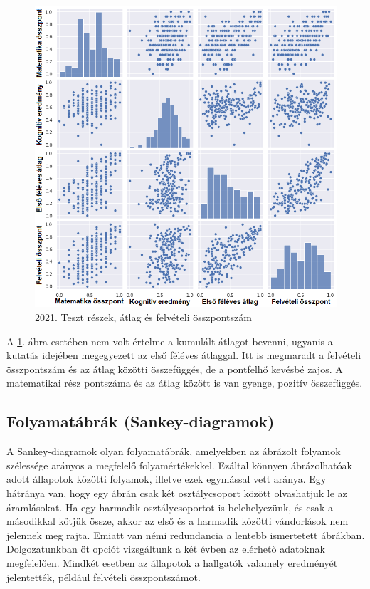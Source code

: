\documentclass[12pt]{article}
\begin{document}
\begin{figure}[H]
\centering
\includegraphics[width=\textwidth]{kepek/2021minmax.png}
\caption{2021. Teszt részek, átlag és felvételi összpontszám}
\label{fig:2021minmax}
\end{figure}

A \ref{fig:2021minmax}. ábra esetében nem volt értelme a kumulált átlagot bevenni, ugyanis a kutatás idejében megegyezett az első féléves átlaggal. Itt is megmaradt a felvételi összpontszám és az átlag közötti összefüggés, de a pontfelhő kevésbé zajos. A matematikai rész pontszáma és az átlag között is van gyenge, pozitív összefüggés.



\subsection{Folyamatábrák (Sankey-diagramok)}
A Sankey-diagramok olyan folyamatábrák, amelyekben az ábrázolt folyamok szélessége arányos a megfelelő folyamértékekkel. Ezáltal könnyen ábrázolhatóak adott állapotok közötti folyamok, illetve ezek egymással vett aránya. Egy hátránya van, hogy egy ábrán csak két osztálycsoport között olvashatjuk le az áramlásokat. Ha egy harmadik osztálycsoportot is belehelyezünk, és csak a másodikkal kötjük össze, akkor az első és a harmadik közötti vándorlások nem jelennek meg rajta. Emiatt van némi redundancia a lentebb ismertetett ábrákban.\\
Dolgozatunkban öt opciót vizsgáltunk a két évben az elérhető adatoknak megfelelően. Mindkét esetben az állapotok a hallgatók valamely eredményét jelentették, például felvételi összpontszámot.
\end{document}
